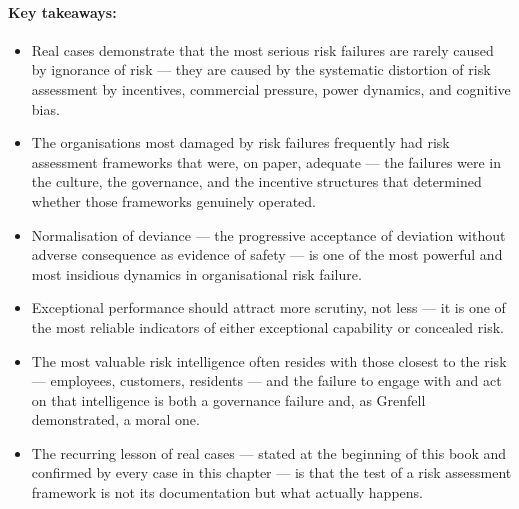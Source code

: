 \paragraph{Key takeaways:}
\begin{itemize}
  \item{Real cases demonstrate that the most serious risk failures are rarely caused by ignorance of risk — they are caused by the systematic distortion of risk assessment by incentives, commercial pressure, power dynamics, and cognitive bias.}
  \item{The organisations most damaged by risk failures frequently had risk assessment frameworks that were, on paper, adequate — the failures were in the culture, the governance, and the incentive structures that determined whether those frameworks genuinely operated.}
  \item{Normalisation of deviance — the progressive acceptance of deviation without adverse consequence as evidence of safety — is one of the most powerful and most insidious dynamics in organisational risk failure.}
  \item{Exceptional performance should attract more scrutiny, not less — it is one of the most reliable indicators of either exceptional capability or concealed risk.}
  \item{The most valuable risk intelligence often resides with those closest to the risk — employees, customers, residents — and the failure to engage with and act on that intelligence is both a governance failure and, as Grenfell demonstrated, a moral one.}
  \item{The recurring lesson of real cases — stated at the beginning of this book and confirmed by every case in this chapter — is that the test of a risk assessment framework is not its documentation but what actually happens.}
\end{itemize}

